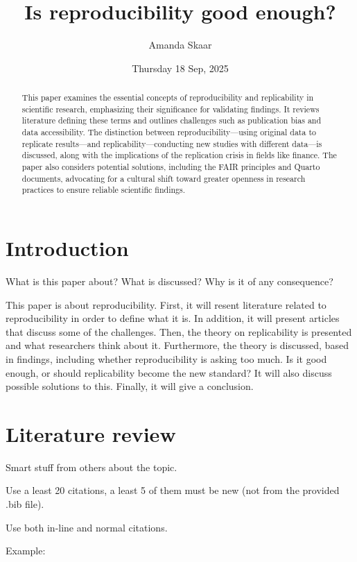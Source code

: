 \documentclass[
  a4paper,
]{article}
\title{Is reproducibility good enough?}
\author{Amanda Skaar}
\date{Thursday 18 Sep, 2025}
\begin{document}
\maketitle
\begin{abstract}
This paper examines the essential concepts of reproducibility and
replicability in scientific research, emphasizing their significance for
validating findings. It reviews literature defining these terms and
outlines challenges such as publication bias and data accessibility. The
distinction between reproducibility---using original data to replicate
results---and replicability---conducting new studies with different
data---is discussed, along with the implications of the replication
crisis in fields like finance. The paper also considers potential
solutions, including the FAIR principles and Quarto documents,
advocating for a cultural shift toward greater openness in research
practices to ensure reliable scientific findings.
\end{abstract}


\section{Introduction}\label{introduction}

What is this paper about? What is discussed? Why is it of any
consequence?

This paper is about reproducibility. First, it will resent literature
related to reproducibility in order to define what it is. In addition,
it will present articles that discuss some of the challenges. Then, the
theory on replicability is presented and what researchers think about
it. Furthermore, the theory is discussed, based in findings, including
whether reproducibility is asking too much. Is it good enough, or should
replicability become the new standard? It will also discuss possible
solutions to this. Finally, it will give a conclusion.

\section{Literature review}\label{literature-review}

Smart stuff from others about the topic.

Use a least 20 citations, a least 5 of them must be new (not from the
provided .bib file).

Use both in-line and normal citations.

Example:
\end{document}
